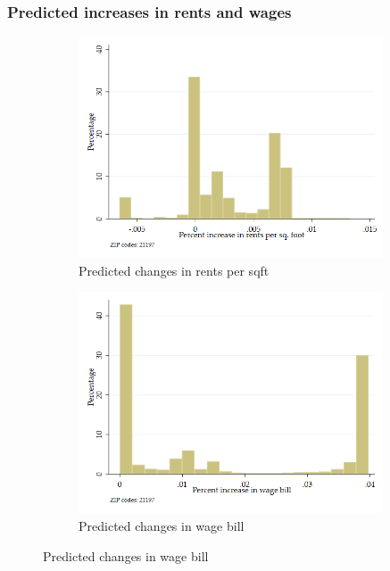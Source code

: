 \documentclass[aspectratio=169, t]{beamer}
\begin{document}
\begin{frame}
	\frametitle{Predicted increases in rents and wages}
	\begin{figure}
		\begin{subfigure}{0.51\textwidth}
			\includegraphics[width = 0.99\textwidth]{counterfactuals/output/perc_incr_rent.png}
			\caption*{Predicted changes in rents per sqft}
		\end{subfigure}%
		\begin{subfigure}{0.51\textwidth}
                         \includegraphics[width = 0.99\textwidth]{counterfactuals/output/perc_incr_wagebill.png}
			\caption*{Predicted changes in wage bill}
		\end{subfigure}
	\end{figure}	
\end{frame}
\end{document}
